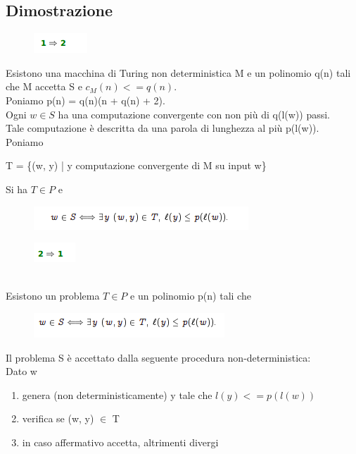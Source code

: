 \subsection{Dimostrazione}
\begin{figure}[htp]
    \includegraphics[scale=0.9]{tesi_stile/img/foto5cap11.png}
\end{figure}
Esistono una macchina di Turing non deterministica M e un polinomio q(n) tali che M accetta S e $c_M (n) <= q(n)$.\\
Poniamo p(n) = q(n)(n + q(n) + 2).\\
Ogni $w \in S$ ha una computazione convergente con non più di q(l(w)) passi.\\
Tale computazione è descritta da una parola di lunghezza al più p(l(w)).\\
Poniamo\\
\begin{center}
    \item T = \{(w, y) | y computazione convergente di M su input w\}
\end{center}
Si ha $T \in P$ e\\
\begin{figure}[htp]
    \centering
    \includegraphics[scale=0.9]{tesi_stile/img/foto6cap11.png}
\end{figure}
\begin{figure}[htp]
    \includegraphics[scale=0.9]{tesi_stile/img/foto7cap11.png}
\end{figure}\\
Esistono un problema $T \in P$ e un polinomio p(n) tali che
\begin{figure}[htp]
    \centering
    \includegraphics[scale=0.9]{tesi_stile/img/foto10cap11.png}
\end{figure}
Il problema S è accettato dalla seguente procedura non-deterministica:\\
Dato w
\begin{enumerate}
    \item genera (non deterministicamente) y tale che $l(y)<= p(l(w))$
    
    \item verifica se (w, y) $\in$ T
    
    \item in caso affermativo accetta, altrimenti divergi
\end{enumerate}

